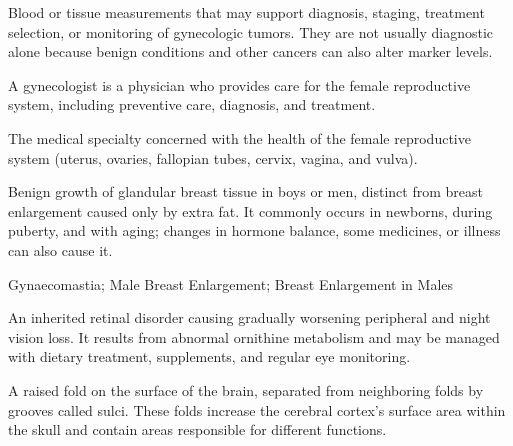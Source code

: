  Blood or tissue measurements that may support diagnosis, staging, treatment selection, or monitoring of gynecologic tumors. They are not usually diagnostic alone because benign conditions and other cancers can also alter marker levels.

 A gynecologist is a physician who provides care for the female reproductive system, including preventive care, diagnosis, and treatment.

 The medical specialty concerned with the health of the female reproductive system
(uterus, ovaries, fallopian tubes, cervix, vagina, and vulva).

 Benign growth of glandular breast tissue in boys or men, distinct from breast enlargement caused only by extra fat. It commonly occurs in newborns, during puberty, and with aging; changes in hormone balance, some medicines, or illness can also cause it.


\synonyms
Gynaecomastia; Male Breast Enlargement; Breast Enlargement in Males

 An inherited retinal disorder causing gradually worsening peripheral and night vision loss. It results from abnormal ornithine metabolism and may be managed with dietary treatment, supplements, and regular eye monitoring.

 A raised fold on the surface of the brain, separated from neighboring folds by grooves called sulci. These folds increase the cerebral cortex’s surface area within the skull and contain areas responsible for different functions.
